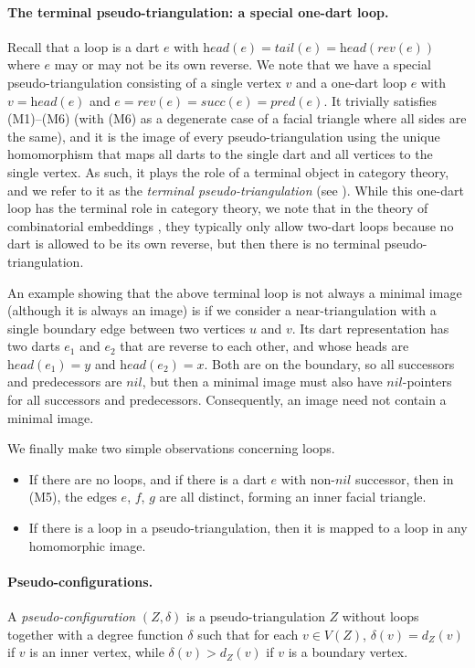 \documentclass[10pt,a4paper]{article}
\def\nil{\textit{nil}}
\def\head{\textit{head}}
\def\tail{\textit{tail}}
\def\reverse{\textit{rev}}
\def\successor{\textit{succ}}
\def\predecessor{\textit{pred}}
\begin{document}
\paragraph{The terminal pseudo-triangulation: a special one-dart loop.}
Recall that a {loop} is a dart $e$ with $\head(e)=\tail(e)=\head(\reverse(e))$ where $e$ may or may not be its own reverse. 
We note that we have a special pseudo-triangulation consisting
of a single vertex $v$ and a one-dart loop $e$ with
$v=\head(e)$ and $e=\reverse(e)=\successor(e)=\predecessor(e)$.
It trivially
satisfies (M1)--(M6) (with (M6) as a degenerate case of a facial triangle where all sides are the same), and it is the image of every pseudo-triangulation using the unique
homomorphism that maps all darts to the single dart and all vertices to the single vertex. As such, it plays the role of a terminal object in category theory, and we refer to it as the \emph{terminal pseudo-triangulation} (see \cite{BarrWels95}). While this one-dart loop has the terminal  role in category theory, we note that in the theory of combinatorial embeddings \cite{MT}, they typically only allow two-dart loops because no dart is allowed to be its own reverse, but then there is no terminal pseudo-triangulation.

An example showing that the above terminal loop is not always a minimal image 
(although it is always an image) is if we consider a near-triangulation with a single boundary edge between two vertices $u$ and $v$. 
Its dart representation has two darts $e_1$ and $e_2$ that are reverse to each other, and whose heads are $\head(e_1)=y$ and $\head(e_2)=x$. 
Both are on the boundary, so all successors and predecessors are $\nil$, but
then a minimal image must
also have $\nil$-pointers for all successors and predecessors.
Consequently, an image need not contain a minimal image.

We finally make two simple observations concerning loops.
\begin{itemize}
    \item If there
    are no loops, and 
    if there is a dart $e$ with non-$\nil$ successor, then in (M5), the edges $e$, $f$, $g$ are all distinct, forming an inner facial triangle.
    \item If there is a loop in a pseudo-triangulation, then it is mapped to a loop in any homomorphic image. 
\end{itemize}

\paragraph{Pseudo-configurations.}
A \emph{pseudo-configuration} $(Z,\delta)$ is a pseudo-triangulation $Z$ without loops together with a degree function $\delta$ such that for each $v\in V(Z)$, $\delta(v)=d_Z(v)$ if $v$ is an inner vertex, while 
$\delta(v)>d_Z(v)$ if $v$ is a boundary vertex.  
\end{document}
